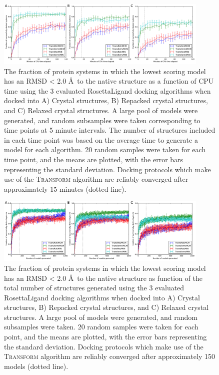 \begin{figure}
\centering
\includegraphics[width=4in]{figures/lowres/fraction_successful_time.pdf}
\caption{
The fraction of protein systems in which the lowest scoring model has an RMSD < 2.0 \AA\ to the native structure as a function of CPU time using the 3 evaluated RosettaLigand docking algorithms when docked into A) Crystal structures, B) Repacked crystal structures, and C) Relaxed crystal structures.
A large pool of models were generated, and random subsamples were taken corresponding to time points at 5 minute intervals.
The number of structures included in each time point was based on the average time to generate a model for each algorithm.
20 random samples were taken for each time point, and the means are plotted, with the error bars representing the standard deviation.
Docking protocols which make use of the \textsc{Transform}  algorithm are reliably converged after approximately 15 minutes (dotted line).
}
\label{fig:fraction_successful_time}
\end{figure}

\begin{figure}
\centering
\includegraphics[width=4in]{figures/lowres/fraction_successful_count.pdf}
\caption{
The fraction of protein systems in which the lowest scoring model has an RMSD < 2.0 \AA\ to the native structure as function of the total number of structures generated using the 3 evaluated RosettaLigand docking algorithms when docked into A) Crystal structures, B) Repacked crystal structures, and C) Relaxed crystal structures.
A large pool of models were generated, and random subsamples were taken.  20 random samples were taken for each point, and the means are plotted, with the error bars representing the standard deviation.
Docking protocols which make use of the \textsc{Transform} algorithm are reliably converged after approximately 150 models (dotted line).
}
\label{fig:fraction_successful_time}
\end{figure}

